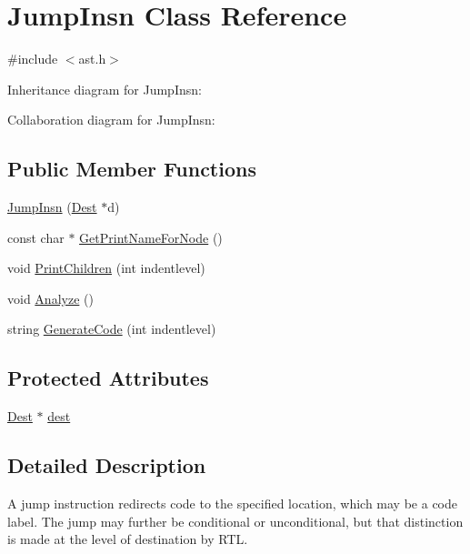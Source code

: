 \hypertarget{class_jump_insn}{}\section{Jump\+Insn Class Reference}
\label{class_jump_insn}


{\ttfamily \#include $<$ast.\+h$>$}



Inheritance diagram for Jump\+Insn\+:


Collaboration diagram for Jump\+Insn\+:
\subsection*{Public Member Functions}
\begin{DoxyCompactItemize}
\item 
\hyperlink{class_jump_insn_a4f55c2e6f2698ba3dcf954b9668bf3c0}{Jump\+Insn} (\hyperlink{class_dest}{Dest} $\ast$d)
\item 
const char $\ast$ \hyperlink{class_jump_insn_a7cde864a50893f645d680015e3cb01c2}{Get\+Print\+Name\+For\+Node} ()
\item 
void \hyperlink{class_jump_insn_a3ab29f081b7c25719c96b6104156c87a}{Print\+Children} (int indentlevel)
\item 
void \hyperlink{class_jump_insn_a2173add8387a3b8bb0e5813942e42b38}{Analyze} ()
\item 
string \hyperlink{class_jump_insn_aadcff8ad57eb8c6597b355f1118a23dc}{Generate\+Code} (int indentlevel)
\end{DoxyCompactItemize}
\subsection*{Protected Attributes}
\begin{DoxyCompactItemize}
\item 
\hyperlink{class_dest}{Dest} $\ast$ \hyperlink{class_jump_insn_af5f460b6bc60667acd1776acb864b602}{dest}
\end{DoxyCompactItemize}


\subsection{Detailed Description}
A jump instruction redirects code to the specified location, which may be a code label. The jump may further be conditional or unconditional, but that distinction is made at the level of destination by R\+TL. 

